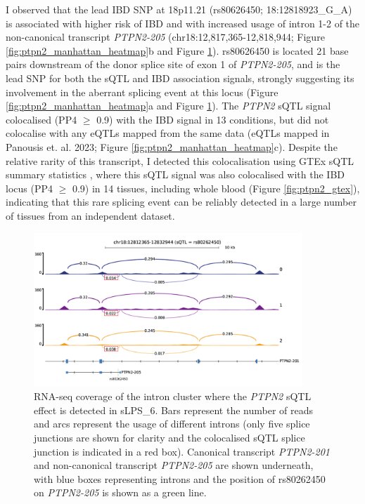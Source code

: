 I observed that the lead IBD SNP at 18p11.21 (rs80626450; 18:12818923\_G\_A) is associated with higher risk of IBD and with increased usage of intron 1-2 of the non-canonical transcript \textit{PTPN2-205} (chr18:12,817,365-12,818,944; Figure \ref{fig:ptpn2_manhattan_heatmap}b and  Figure \ref{fig:ptpn2_sashimi}). rs80626450 is located 21 base pairs downstream of the donor splice site of exon 1 of \textit{PTPN2-205}, and is the lead SNP for both the sQTL and IBD association signals, strongly suggesting its involvement in the aberrant splicing event at this locus (Figure \ref{fig:ptpn2_manhattan_heatmap}a and Figure \ref{fig:ptpn2_sashimi}). The \textit{PTPN2} sQTL signal colocalised (PP4 $\geq$ 0.9) with the IBD signal in 13 conditions, but did not colocalise with any eQTLs mapped from the same data (eQTLs mapped in Panousis et. al. 2023; Figure \ref{fig:ptpn2_manhattan_heatmap}c). Despite the relative rarity of this transcript, I detected this colocalisation using GTEx sQTL summary statistics \cite{The_GTEx_Consortium2020-gg}, where this sQTL signal was also colocalised with the IBD locus (PP4 $\geq$ 0.9) in 14 tissues, including whole blood (Figure \ref{fig:ptpn2_gtex}), indicating that this rare splicing event can be reliably detected in a large number of tissues from an independent dataset. \\ 

\begin{figure}[H]
  \centering
  \includegraphics[width=0.9\textwidth]{ptpn2_sashimi}
  \caption[\textit{PTPN2} RNA-seq coverage plot]{RNA-seq coverage of the intron cluster where the \textit{PTPN2} sQTL effect is detected in sLPS\_6. Bars represent the number of reads and arcs represent the usage of different introns (only five splice junctions are shown for clarity and the colocalised sQTL splice junction is indicated in a red box). Canonical transcript \textit{PTPN2-201} and non-canonical transcript \textit{PTPN2-205} are shown underneath, with blue boxes representing introns and the position of rs80262450 on \textit{PTPN2-205} is shown as a green line.}
  \label{fig:ptpn2_sashimi}   
\end{figure}


